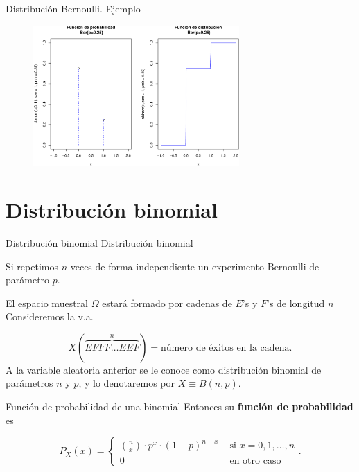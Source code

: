 \documentclass[
  ignorenonframetext,
  aspectratio=169]{beamer}
\begin{document}
\begin{frame}{Distribución Bernoulli. Ejemplo}
\protect\hypertarget{distribuciuxf3n-bernoulli.-ejemplo-2}{}
\begin{figure}

{\centering \includegraphics[width=0.7\textwidth,height=\textheight]{Tema_3_1_Notables_files/figure-beamer/ber_plot_1-1.pdf}

}

\end{figure}
\end{frame}

\hypertarget{distribuciuxf3n-binomial}{%
\section{Distribución binomial}\label{distribuciuxf3n-binomial}}

\begin{frame}{Distribución binomial}
\protect\hypertarget{distribuciuxf3n-binomial-1}{}
Distribución binomial

Si repetimos \(n\) veces de forma independiente un experimento Bernoulli
de parámetro \(p\).

El espacio muestral \(\Omega\) estará formado por cadenas de \(E\)'s y
\(F\)'s de longitud \(n\) Consideremos la v.a.

\[X(\overbrace{EFFF\ldots EEF}^{n})=\mbox{número de éxitos en la cadena}.\]
A la variable aleatoria anterior se le conoce como distribución binomial
de parámetros \(n\) y \(p\), y lo denotaremos por \(X\equiv B(n,p).\)
\end{frame}

\begin{frame}{Función de probabilidad de una binomial}
\protect\hypertarget{funciuxf3n-de-probabilidad-de-una-binomial}{}
Entonces su \textbf{función de probabilidad} es

\[
P_{X}(x)=\left\{
\begin{array}{ll}
{n\choose x}\cdot  p^x \cdot(1-p)^{n-x} &\mbox{ si } x=0,1,\ldots,n\\
0  & \mbox{ en otro caso}
\end{array}\right..
\]
\end{frame}
\end{document}
